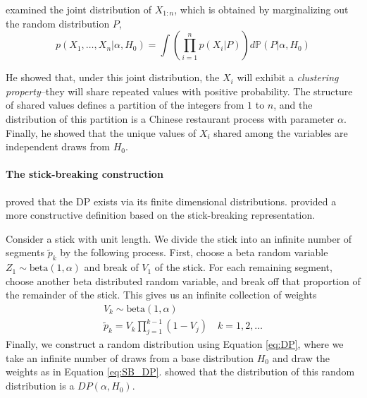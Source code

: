 \cite{ferguson73} examined the joint distribution of $X_{1:n}$, which is obtained by marginalizing out the random distribution $P$,
\begin{equation}
p(X_1,\dots,X_n|\alpha,H_0) = \int{\left(\prod_{i=1}^n p(X_i|P) \right) d \mathbb{P}(P|\alpha,H_0)}
\end{equation}

He showed that, under this joint distribution, the $X_i$ will exhibit a \textit{clustering property}--they will share repeated values with positive probability. The structure of shared values defines a partition of the integers from $1$ to $n$, and the distribution of this partition is a Chinese restaurant process with parameter $\alpha$. Finally, he showed that the unique values of $X_i$ shared among the variables are independent draws from $H_0$.

\paragraph{The stick-breaking construction}
\cite{ferguson73} proved that the \gls{DP} exists via its finite dimensional distributions. \cite{sethuraman94} provided a more constructive definition based on the stick-breaking representation.

Consider a stick with unit length. We divide the stick into an infinite number of segments $\tilde{p}_k$ by the following process. First, choose a beta random variable $Z_1 \sim \text{beta}(1, \alpha)$ and break of $V_1$ of the stick. For each remaining segment, choose another beta distributed random variable, and break off that proportion of the remainder of the stick. This gives us an infinite collection of weights 
\begin{gather}
V_k \sim \text{beta}(1, \alpha) \\
\tilde{p}_k = V_k \prod_{j=1}^{k-1}(1-V_j) \quad k= 1,2,\dots \label{eq:SB_DP}
\end{gather}
Finally, we construct a random distribution using Equation \ref{eq:DP}, where we take an infinite number of draws from a base distribution $H_0$ and draw the weights as in Equation \ref{eq:SB_DP}. \cite{sethuraman94} showed that the distribution of this random distribution is a $DP(\alpha,H_0)$.

